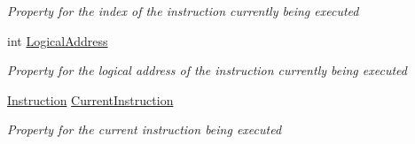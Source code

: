 \begin{DoxyCompactItemize}
\begin{DoxyCompactList}\small\item\em Property for the index of the instruction currently being executed \end{DoxyCompactList}\item 
int \hyperlink{class_c_p_u___o_s___simulator_1_1_c_p_u_1_1_execution_unit_ac939e9a08b30b2cc3a9438d6c1cc5a61}{Logical\+Address}
\begin{DoxyCompactList}\small\item\em Property for the logical address of the instruction currently being executed \end{DoxyCompactList}\item 
\hyperlink{class_c_p_u___o_s___simulator_1_1_c_p_u_1_1_instruction}{Instruction} \hyperlink{class_c_p_u___o_s___simulator_1_1_c_p_u_1_1_execution_unit_a285d7b487a3ac5eff07c640e438ceb11}{Current\+Instruction}
\begin{DoxyCompactList}\small\item\em Property for the current instruction being executed \end{DoxyCompactList}\end{DoxyCompactItemize}
